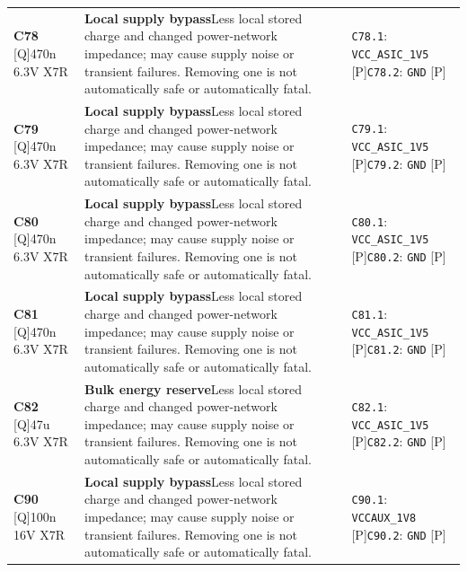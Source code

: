 \documentclass[11pt,a4paper]{article}
\begin{document}
\begin{longtable}{@{}P{27mm}P{77mm}P{62mm}@{}}
\textbf{C78} [Q]\newline 470n 6.3V X7R & \textbf{Local supply bypass}\newline Less local stored charge and changed power-network impedance; may cause supply noise or transient failures. Removing one is not automatically safe or automatically fatal. & \nolinkurl{C78.1}: \nolinkurl{VCC_ASIC_1V5} [P]\newline \nolinkurl{C78.2}: \nolinkurl{GND} [P] \\
\textbf{C79} [Q]\newline 470n 6.3V X7R & \textbf{Local supply bypass}\newline Less local stored charge and changed power-network impedance; may cause supply noise or transient failures. Removing one is not automatically safe or automatically fatal. & \nolinkurl{C79.1}: \nolinkurl{VCC_ASIC_1V5} [P]\newline \nolinkurl{C79.2}: \nolinkurl{GND} [P] \\
\textbf{C80} [Q]\newline 470n 6.3V X7R & \textbf{Local supply bypass}\newline Less local stored charge and changed power-network impedance; may cause supply noise or transient failures. Removing one is not automatically safe or automatically fatal. & \nolinkurl{C80.1}: \nolinkurl{VCC_ASIC_1V5} [P]\newline \nolinkurl{C80.2}: \nolinkurl{GND} [P] \\
\textbf{C81} [Q]\newline 470n 6.3V X7R & \textbf{Local supply bypass}\newline Less local stored charge and changed power-network impedance; may cause supply noise or transient failures. Removing one is not automatically safe or automatically fatal. & \nolinkurl{C81.1}: \nolinkurl{VCC_ASIC_1V5} [P]\newline \nolinkurl{C81.2}: \nolinkurl{GND} [P] \\
\textbf{C82} [Q]\newline 47u 6.3V X7R & \textbf{Bulk energy reserve}\newline Less local stored charge and changed power-network impedance; may cause supply noise or transient failures. Removing one is not automatically safe or automatically fatal. & \nolinkurl{C82.1}: \nolinkurl{VCC_ASIC_1V5} [P]\newline \nolinkurl{C82.2}: \nolinkurl{GND} [P] \\
\textbf{C90} [Q]\newline 100n 16V X7R & \textbf{Local supply bypass}\newline Less local stored charge and changed power-network impedance; may cause supply noise or transient failures. Removing one is not automatically safe or automatically fatal. & \nolinkurl{C90.1}: \nolinkurl{VCCAUX_1V8} [P]\newline \nolinkurl{C90.2}: \nolinkurl{GND} [P] \\

\end{longtable}
\end{document}
